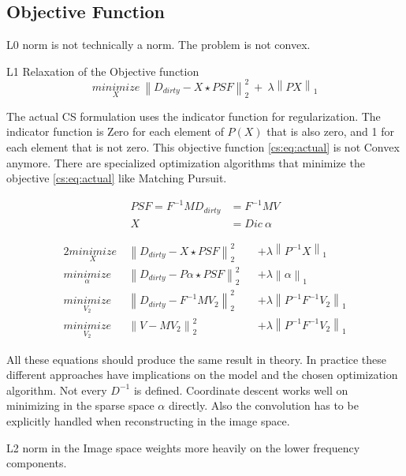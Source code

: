 \subsection{Objective Function}
L0 norm is not technically a norm. The problem is not convex.

L1 Relaxation of the Objective function
\begin{equation} \label{cs:eq:l1}
\underset{X}{minimize} \: \left \| D_{dirty} - X \star PSF \right \|_2^2 \: + \: \lambda \left \| PX \right \|_1
\end{equation}

The actual CS formulation uses the indicator function for regularization. The indicator function is Zero for each element of $P(X)$ that is also zero, and 1 for each element that is not zero. This objective function \eqref{cs:eq:actual} is not Convex anymore. There are specialized optimization algorithms that minimize the objective \eqref{cs:eq:actual} like Matching Pursuit. 

\begin{equation}
	\begin{split}
		PSF = F^{-1}M
		D_{dirty} &= F^{-1}MV \\
		X &= Dic\:\alpha
	\end{split}
\end{equation}

\begin{alignat*}{2}
	\underset{X}{minimize} \:& \left \| D_{dirty} - X \star PSF \right \|_2^2 &&+  \lambda \left \| P^{-1}X \right \|_1 \\
	\underset{\alpha}{minimize} \:& \left \| D_{dirty} - P\alpha \star PSF \right \|_2^2 &&+ \lambda \left \| \alpha \right \|_1 \\
	\underset{V_2}{minimize} \:& \left \| D_{dirty} - F^{-1} M V_2 \right \|_2^2 &&+ \lambda \left \| P^{-1}F^{-1}V_2\right \|_1 \\
	\underset{V_2}{minimize} \:& \left \| V - M V_2 \right \|_2^2 &&+ \lambda \left \| P^{-1}F^{-1}V_2\right \|_1
\end{alignat*}

All these equations should produce the same result in theory. In practice these different approaches have implications on the model and the chosen optimization algorithm. Not every $D^{-1}$ is defined. Coordinate descent works well on minimizing in the sparse space $\alpha$ directly. Also the convolution has to be explicitly handled when reconstructing in the image space.

L2 norm in the Image space weights more heavily on the lower frequency components.


